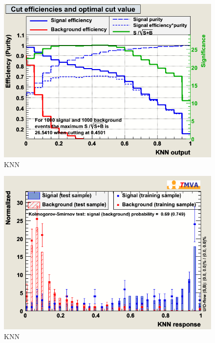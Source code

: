 \begin{figure}[h]
\begin{center}
\includegraphics[width=1.0\textwidth]{images/pkMvaEffs_KNN.png}
\caption{KNN}
\label{fig:pkMvaEffsKNN}
\end{center}
\end{figure}

\begin{figure}[h]
\begin{center}
\includegraphics[width=1.0\textwidth]{images/pkOvertrain_KNN.png}
\caption{KNN}
\label{fig:pkOvertrainKNN}
\end{center}
\end{figure}


